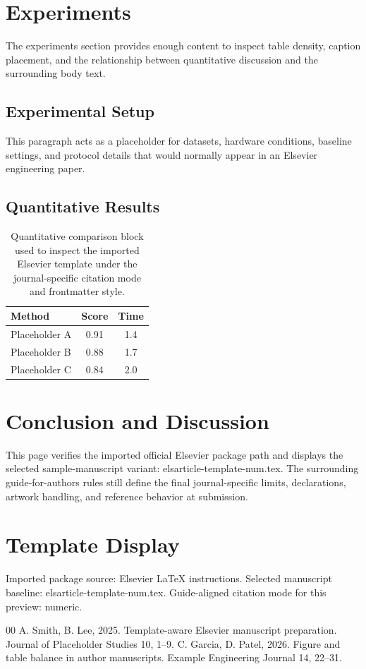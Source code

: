 \documentclass[preprint,12pt]{elsarticle}
\begin{document}
\section{Experiments}
The experiments section provides enough content to inspect table density, caption placement, and the relationship between quantitative discussion and the surrounding body text.
\subsection{Experimental Setup}
This paragraph acts as a placeholder for datasets, hardware conditions, baseline settings, and protocol details that would normally appear in an Elsevier engineering paper.
\subsection{Quantitative Results}
\begin{table}[t]
\centering
\caption{Quantitative comparison block used to inspect the imported Elsevier template under the journal-specific citation mode and frontmatter style.}
\begin{tabular}{lcc}
\toprule
Method & Score & Time \\
\midrule
Placeholder A & 0.91 & 1.4 \\
Placeholder B & 0.88 & 1.7 \\
Placeholder C & 0.84 & 2.0 \\
\bottomrule
\end{tabular}
\end{table}
\section{Conclusion and Discussion}
This page verifies the imported official Elsevier package path and displays the selected sample-manuscript variant: elsarticle-template-num.tex. The surrounding guide-for-authors rules still define the final journal-specific limits, declarations, artwork handling, and reference behavior at submission.
\section*{Template Display}
Imported package source: Elsevier LaTeX instructions. Selected manuscript baseline: elsarticle-template-num.tex. Guide-aligned citation mode for this preview: numeric.
\begin{thebibliography}{00}
 A. Smith, B. Lee, 2025. Template-aware Elsevier manuscript preparation. Journal of Placeholder Studies 10, 1--9.
 C. Garcia, D. Patel, 2026. Figure and table balance in author manuscripts. Example Engineering Journal 14, 22--31.
\end{thebibliography}
\end{document}
